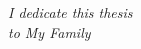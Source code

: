\chapter*{}
\thispagestyle{empty}
\begin{Large}
\begin{flushright}
\vspace{15cm}
\hspace{6cm}\emph{I dedicate this thesis \\ to My Family}
\end{flushright}
\end{Large}